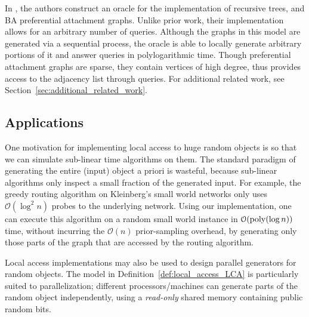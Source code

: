 In \cite{reut}, the authors construct an oracle for the implementation of recursive trees, and BA preferential attachment graphs.
Unlike prior work, their implementation allows for an arbitrary number of queries.
Although the graphs in this model are generated via a sequential process,
the oracle is able to locally generate arbitrary portions of it and answer queries in polylogarithmic time.
Though preferential attachment graphs are sparse, they contain vertices of high degree,
thus \cite{reut} provides access to the adjacency list through  queries.
For additional related work, see Section~\ref{sec:additional_related_work}.



\subsection{Applications}
\label{sec:applications}
One motivation for implementing local access to huge random objects is so that we can simulate sub-linear time algorithms on them.
The standard paradigm of generating the entire (input) object a priori is wasteful,
because sub-linear algorithms only inspect a small fraction of the generated input.
For example, the greedy routing algorithm on Kleinberg's small world networks \cite{kleinberg}
only uses $\mathcal O(\log^2 n)$ probes to the underlying network.
Using our implementation, one can execute this algorithm on a random small world instance in $\mathcal O(\mathrm{poly}(\log n))$ time,
without incurring the $\mathcal O(n)$ prior-sampling overhead, by generating only those parts of the graph that are accessed by the routing algorithm.

Local access implementations may also be used to design parallel generators for random objects.
The model in Definition~\ref{def:local_access_LCA} is particularly suited to parallelization;
different processors/machines can generate parts of the random object independently,
using a \emph{read-only} shared memory containing public random bits.
